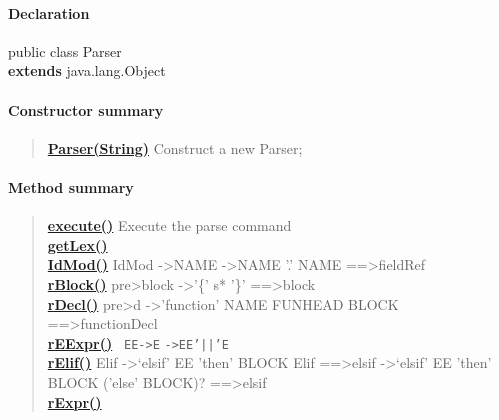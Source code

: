 {{{{\paragraph{Declaration}{
\small public class Parser
\\ {\bf  extends} java.lang.Object
}
\paragraph{Constructor summary}{
\begin{verse}
\hyperlink{org.openmrs.module.dssmodule.parser.Parser(java.lang.String)}{{\bf Parser(String)}} Construct a new Parser;\\
\end{verse}
}
\paragraph{Method summary}{
\begin{verse}
\hyperlink{org.openmrs.module.dssmodule.parser.Parser.execute()}{{\bf execute()}} Execute the parse command\\
\hyperlink{org.openmrs.module.dssmodule.parser.Parser.getLex()}{{\bf getLex()}} \\
\hyperlink{org.openmrs.module.dssmodule.parser.Parser.IdMod()}{{\bf IdMod()}} IdMod -\textgreater  NAME -\textgreater  NAME '.' NAME ==\textgreater  fieldRef\\
\hyperlink{org.openmrs.module.dssmodule.parser.Parser.rBlock()}{{\bf rBlock()}} pre\textgreater  block -\textgreater  '\{' s* '\}' ==\textgreater  block\\
\hyperlink{org.openmrs.module.dssmodule.parser.Parser.rDecl()}{{\bf rDecl()}} pre\textgreater  d -\textgreater  'function' NAME FUNHEAD BLOCK ==\textgreater  functionDecl\\
\hyperlink{org.openmrs.module.dssmodule.parser.Parser.rEExpr()}{{\bf rEExpr()}} \texttt{\small
\mbox{}\newline \phantom{ }EE\phantom{ }-\textgreater \phantom{ }E}\mbox{}\newline
\texttt{\small \phantom{ }\phantom{ }\phantom{ }\phantom{ }-\textgreater \phantom{ }EE\phantom{ }'||'\phantom{ }E}
\\
\hyperlink{org.openmrs.module.dssmodule.parser.Parser.rElif()}{{\bf rElif()}} Elif -\textgreater  ‘elsif’ EE 'then' BLOCK Elif ==\textgreater  elsif -\textgreater  ‘elsif’ EE 'then' BLOCK ('else' BLOCK)? ==\textgreater  elsif\\
\hyperlink{org.openmrs.module.dssmodule.parser.Parser.rExpr()}{{\bf rExpr()}} \texttt{\small
}
\end{verse}}}}}}
